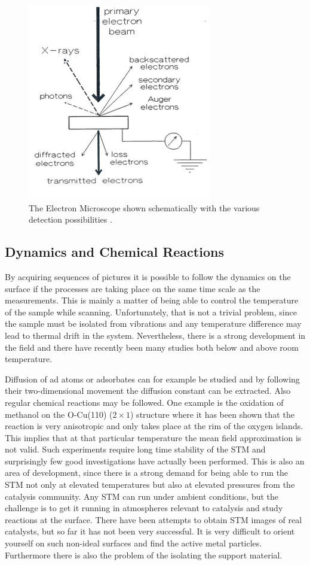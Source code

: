 \begin{figure}[h!]
	\begin{center}
	\includegraphics[scale=4]{figures/10_15.png}
	\caption{The Electron Microscope shown schematically with the various detection possibilities \cite{Niemantsverdriet}.}
	\label{fig:emscheme}
	\end{center}
\end{figure}

\subsection{Dynamics and Chemical Reactions}
By acquiring sequences of pictures it is possible to follow the dynamics on the surface if the processes are taking place on the same time scale as the measurements. This is mainly a matter of being able to control the temperature of the sample while scanning. Unfortunately, that is not a trivial problem, since the sample must be isolated from vibrations and any temperature difference may lead to thermal drift in the system. Nevertheless, there is a strong development in the field and there have recently been many studies both below and above room temperature. 

Diffusion of ad atoms or adsorbates can for example be studied and by following their two-dimensional movement the diffusion constant can be extracted. Also regular chemical reactions may be followed. One example is the oxidation of methanol on the O-Cu(110) ($2\times 1$) structure where it has been shown that the reaction is very anisotropic and only takes place at the rim of the oxygen islands. This implies that at that particular temperature the mean field approximation is not valid. Such experiments require long time stability of the STM and surprisingly few good investigations have actually been performed. This is also an area of development, since there is a strong demand for being able to run the STM not only at elevated temperatures but also at elevated pressures from the catalysis community. Any STM can run under ambient conditions, but the challenge is to get it running in atmospheres relevant to catalysis and study reactions at the surface. There have been attempts to obtain STM images of real catalysts, but so far it has not been very successful. It is very difficult to orient yourself on such non-ideal surfaces and find the active metal particles. Furthermore there is also the problem of the isolating the support material.

